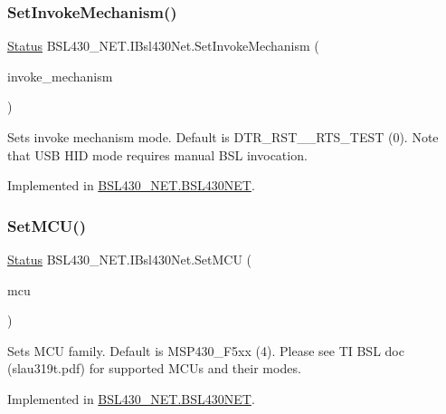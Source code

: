 \subsubsection{\texorpdfstring{SetInvokeMechanism()}{SetInvokeMechanism()}}
{\footnotesize\ttfamily \mbox{\hyperlink{class_b_s_l430___n_e_t_1_1_status}{Status}} B\+S\+L430\+\_\+\+N\+E\+T.\+I\+Bsl430\+Net.\+Set\+Invoke\+Mechanism (\begin{DoxyParamCaption}\item[{\mbox{\hyperlink{namespace_b_s_l430___n_e_t_a6571fdf0fbbc8408b8428f4d642c1305}{Invoke\+Mechanism}}}]{invoke\+\_\+mechanism }\end{DoxyParamCaption})}



Sets invoke mechanism mode. Default is D\+T\+R\+\_\+\+R\+S\+T\+\_\+\+\_\+\+R\+T\+S\+\_\+\+T\+E\+ST (0). Note that U\+SB H\+ID mode requires manual B\+SL invocation. 



Implemented in \mbox{\hyperlink{class_b_s_l430___n_e_t_1_1_b_s_l430_n_e_t_ad8ec7dceb979a98e30bf59f7c5fde620}{B\+S\+L430\+\_\+\+N\+E\+T.\+B\+S\+L430\+N\+ET}}.

\mbox{\label{interface_b_s_l430___n_e_t_1_1_i_bsl430_net_ab73461fb74eb2d85fd06ece052558b0d}} 
\subsubsection{\texorpdfstring{SetMCU()}{SetMCU()}}
{\footnotesize\ttfamily \mbox{\hyperlink{class_b_s_l430___n_e_t_1_1_status}{Status}} B\+S\+L430\+\_\+\+N\+E\+T.\+I\+Bsl430\+Net.\+Set\+M\+CU (\begin{DoxyParamCaption}\item[{\mbox{\hyperlink{namespace_b_s_l430___n_e_t_a2cdaa65be7e1679fc8ca77610b19a490}{M\+CU}}}]{mcu }\end{DoxyParamCaption})}



Sets M\+CU family. Default is M\+S\+P430\+\_\+\+F5xx (4). Please see TI B\+SL doc (slau319t.\+pdf) for supported M\+C\+Us and their modes. 



Implemented in \mbox{\hyperlink{class_b_s_l430___n_e_t_1_1_b_s_l430_n_e_t_a22d6c0af4298026d7939bc993e9791ad}{B\+S\+L430\+\_\+\+N\+E\+T.\+B\+S\+L430\+N\+ET}}.

